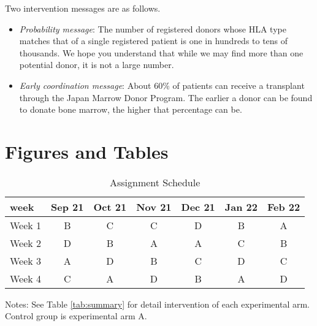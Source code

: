 \documentclass[12pt, a4paper]{article}
\providecommand{\tightlist}{%
  \setlength{\itemsep}{0pt}\setlength{\parskip}{0pt}}
\begin{document}
Two intervention messages are as follows.

\begin{itemize}
\tightlist
\item
  \emph{Probability message}: The number of registered donors whose HLA type matches that of a single registered patient is one in hundreds to tens of thousands. We hope you understand that while we may find more than one potential donor, it is not a large number.
\item
  \emph{Early coordination message}: About 60\% of patients can receive a transplant through the Japan Marrow Donor Program. The earlier a donor can be found to donate bone marrow, the higher that percentage can be.
\end{itemize}

\setcounter{figure}{0}
\setcounter{table}{0}
\renewcommand\thefigure{\thesection\arabic{figure}}
\renewcommand{\thetable}{\thesection\arabic{table}}
\renewcommand{\theHfigure}{\thesection\arabic{figure}}
\renewcommand{\theHtable}{\thesection\arabic{table}}

\hypertarget{figtab}{%
\section{Figures and Tables}\label{figtab}}

\begin{table}[H]

\caption{\label{tab:assignment}Assignment Schedule}
\centering
\fontsize{9}{11}\selectfont
\fontsize{9}{11}\selectfont
\begin{threeparttable}
\begin{tabular}[t]{lcccccc}
\toprule
week & Sep 21 & Oct 21 & Nov 21 & Dec 21 & Jan 22 & Feb 22\\
\midrule
Week 1 & B & C & C & D & B & A\\
Week 2 & D & B & A & A & C & B\\
Week 3 & A & D & B & C & D & C\\
Week 4 & C & A & D & B & A & D\\
\bottomrule
\end{tabular}
\begin{tablenotes}
\item Notes: See Table \ref{tab:summary} for detail intervention of each experimental arm. Control group is experimental arm A.
\end{tablenotes}
\end{threeparttable}
\end{table}
\end{document}
